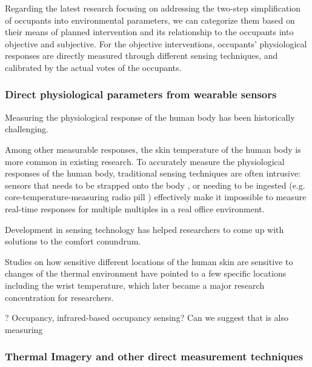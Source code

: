 Regarding the latest research focusing on addressing the two-step simplification of occupants into environmental parameters, we can categorize them based on their means of planned intervention and its relationship to the occupants into objective and subjective. For the objective interventions, occupants' physiological responses are directly measured through different sensing techniques, and calibrated by the actual votes of the occupants. 

\subsubsection{Direct physiological parameters from wearable sensors}
Measuring the physiological response of the human body has been historically challenging. 

Among other measurable responses, the skin temperature of the human body is more common in existing research. To accurately measure the physiological responses of the human body, traditional sensing techniques are often intrusive: sensors that needs to be strapped onto the body \cite{mccarthy_validation_2016}, or needing to be ingested (e.g. core-temperature-measuring radio pill \cite{}) effectively make it impossible to measure real-time responses for multiple multiples in a real office environment. 

Development in sensing technology has helped researchers to come up with solutions to the comfort conundrum. 

Studies on how sensitive different locations of the human skin are sensitive to changes of the thermal environment have pointed to a few specific locations including the wrist temperature, which later became a major research concentration for researchers\cite{choi_cobi:_2010}. 





? Occupancy, infrared-based occupancy sensing? Can we suggest that is also measuring 
\subsubsection{Thermal Imagery and other direct measurement techniques}

            

